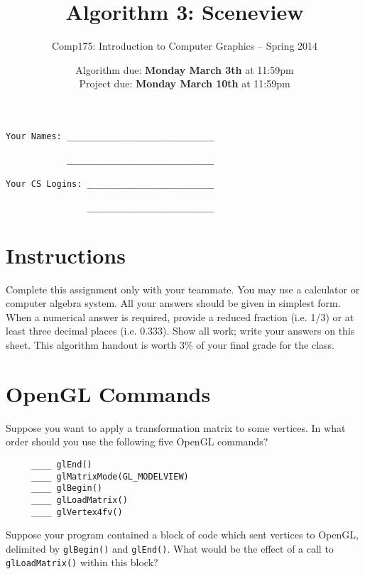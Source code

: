 \documentclass[10pt,twocolumn]{article}
\title{\Huge{\bf Algorithm 3: Sceneview}}
\author{Comp175: Introduction to Computer Graphics -- Spring 2014}
\date{Algorithm due:  {\bf Monday March 3th} at 11:59pm\\
Project due:  {\bf Monday March 10th} at 11:59pm}
\begin{document}
\maketitle

\begin{verbatim}
Your Names: _____________________________

            _____________________________

Your CS Logins: _________________________

                _________________________
\end{verbatim}


\section{Instructions}
Complete this assignment only with your teammate. You may use a
calculator or computer algebra system. All your answers should be given in simplest form.
When a numerical answer is required, provide a reduced fraction (i.e. 1/3) or at least three
decimal places (i.e. 0.333). Show all work; write your answers on this sheet. This algorithm handout is worth 3\% of your final grade for the class.

\section{OpenGL Commands}
\begin{framed}
 Suppose you want to apply a transformation matrix to some vertices. In what order should you use the following five OpenGL commands?
\begin{verbatim}
     ____ glEnd()
     ____ glMatrixMode(GL_MODELVIEW)
     ____ glBegin()
     ____ glLoadMatrix()
     ____ glVertex4fv()
\end{verbatim}
\end{framed}


\begin{framed}
 Suppose your program contained a block of code which sent vertices to OpenGL, delimited by {\tt glBegin()} and {\tt glEnd()}. What would be the effect of a call to {\tt glLoadMatrix()} within this block?
\vspace{10em}
\end{framed}
\end{document}
